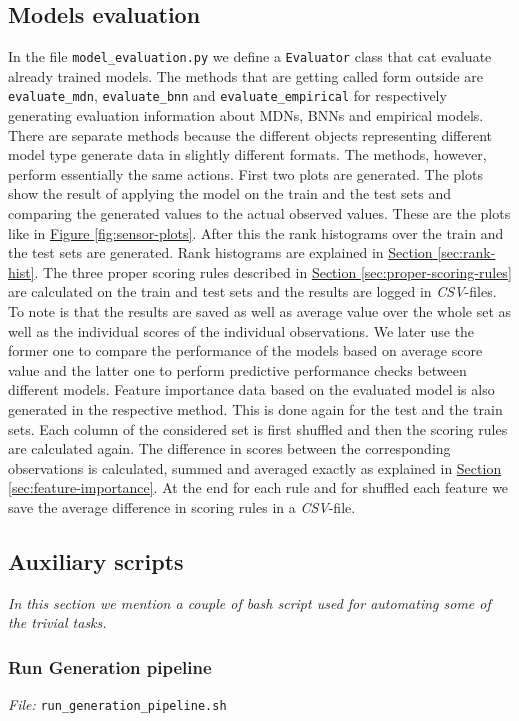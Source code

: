 \documentclass[12pt,a4paper,twoside]{scrartcl}
\numberwithin{equation}{section}
\newcommand{\reffig}[1]{\hyperref[#1]{Figure \ref*{#1}}}
\newcommand{\refsec}[1]{\hyperref[#1]{Section \ref*{#1}}}
\begin{document}
\subsection{Models evaluation}\label{sec:models-eval}
In the file \texttt{model\_evaluation.py} we define a \texttt{Evaluator} class that cat evaluate already trained models. The methods that are getting called form outside are \texttt{evaluate\_mdn}, \texttt{evaluate\_bnn} and \texttt{evaluate\_empirical} for respectively generating evaluation information about MDNs, BNNs and empirical models. There are separate methods because the different objects representing different model type generate data in slightly different formats. The methods, however, perform essentially the same actions. First two plots are generated. The plots show the result of applying the model on the train and the test sets and comparing the generated values to the actual observed values. These are the plots like in \reffig{fig:sensor-plots}. After this the rank histograms over the train and the test sets are generated. Rank histograms are explained in \refsec{sec:rank-hist}. The three proper scoring rules described in \refsec{sec:proper-scoring-rules} are calculated on the train and test sets and the results are logged in \emph{CSV}-files. To note is that the results are saved as well as average value over the whole set as well as the individual scores of the individual observations. We later use the former one to compare the performance of the models based on average score value and the latter one to perform predictive performance checks between different models. Feature importance data based on the evaluated model is also generated in the respective method. This is done again for the test and the train sets. Each column of the considered set is first shuffled and then the scoring rules are calculated again. The difference in scores between the corresponding observations is calculated, summed and averaged exactly as explained in \refsec{sec:feature-importance}. At the end for each rule and for shuffled each feature we save the average difference in scoring rules in a \emph{CSV}-file.
\subsection{Auxiliary scripts}\label{sec:aux-scripts}
\noindent\emph{In this section we mention a couple of bash script used for automating some of the trivial tasks.} 
\subsubsection{Run Generation pipeline}\label{sec:gen-pipe}
\noindent\emph{File: }\texttt{run\_generation\_pipeline.sh}
\end{document}
